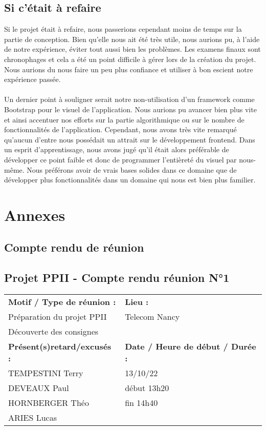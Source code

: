 \documentclass[12pt,titlepage]{report}
\begin{document}
\section{Si c'était à refaire}

Si le projet était à refaire, nous passerions cependant moins de temps sur la partie de conception. Bien qu’elle nous ait été très utile, nous aurions pu, à l’aide de notre expérience, éviter tout aussi bien les problèmes. Les examens finaux sont chronophages et cela a été un point difficile à gérer lors de la création du projet. Nous aurions du nous faire un peu plus confiance et utiliser à bon escient notre expérience passée.
\\ \\ 

Un dernier point à souligner serait notre non-utilisation d'un framework comme Bootstrap pour le visuel de l'application. 
Nous aurions pu avancer bien plus vite et ainsi accentuer nos efforts sur la partie algorithmique ou sur le nombre de fonctionnalités de l’application. Cependant, nous avons très vite remarqué qu’aucun d’entre nous possédait un attrait sur le développement frontend. Dans un esprit d’apprentissage, nous avons jugé qu’il était alors préférable de développer ce point faible et donc de programmer l’entièreté du visuel par nous-même.  Nous préférons avoir de vrais bases solides dans ce domaine que de développer plus fonctionnalités dans un domaine qui nous est bien plus familier. 
 

\chapter{Annexes}


\newpage

\section{Compte rendu de réunion}
\section*{Projet PPII - Compte rendu réunion N°1}
\begin{tabular}{|p{7cm}|p{6cm}|}
    \hline
    \textbf{Motif / Type de réunion :}
    & \textbf{Lieu :}
    \\
    Préparation du projet PPII
    & 
    Telecom Nancy
    \\ 
    Découverte des consignes &
    \\\hline
    \textbf{Présent(s)retard/excusés :}
    &
    \textbf{Date / Heure de début / Durée :}
    \\ 
    TEMPESTINI Terry &  13/10/22\\  
    DEVEAUX Paul & début 13h20\\
    HORNBERGER Théo & fin 14h40\\
    ARIES Lucas & 
    \\ \hline
\end{tabular}
\end{document}
